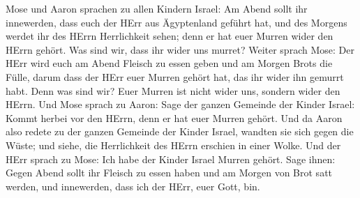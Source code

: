  Mose und Aaron sprachen zu allen Kindern Israel: Am Abend
sollt ihr innewerden, dass euch der HErr aus Ägyptenland geführt hat,
 und des Morgens werdet ihr des HErrn Herrlichkeit sehen;
denn er hat euer Murren wider den HErrn gehört. Was sind wir, dass ihr
wider uns murret?  Weiter sprach Mose: Der HErr wird euch am
Abend Fleisch zu essen geben und am Morgen Brots die Fülle, darum dass
der HErr euer Murren gehört hat, das ihr wider ihn gemurrt habt. Denn
was sind wir? Euer Murren ist nicht wider uns, sondern wider den HErrn.
 Und Mose sprach zu Aaron: Sage der ganzen Gemeinde der
Kinder Israel: Kommt herbei vor den HErrn, denn er hat euer Murren
gehört.  Und da Aaron also redete zu der ganzen Gemeinde
der Kinder Israel, wandten sie sich gegen die Wüste; und siehe, die
Herrlichkeit des HErrn erschien in einer Wolke.  Und der
HErr sprach zu Mose:  Ich habe der Kinder Israel Murren
gehört. Sage ihnen: Gegen Abend sollt ihr Fleisch zu essen haben und am
Morgen von Brot satt werden, und innewerden, dass ich der HErr, euer
Gott, bin.

